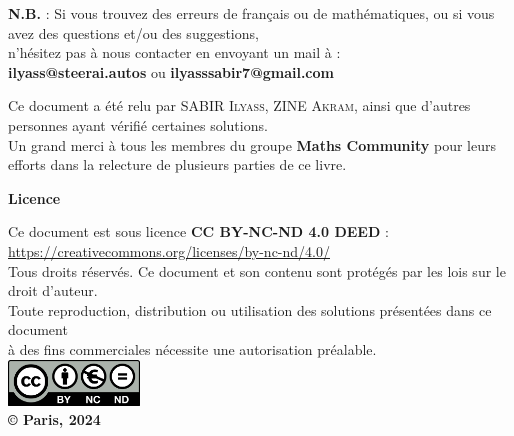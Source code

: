 \begin{center}
  \textbf{N.B.} : Si vous trouvez des erreurs de français ou de mathématiques, ou si vous avez des questions et/ou des suggestions,\\
  n'hésitez pas à nous contacter en envoyant un mail à :\\[0.2cm]
  \textbf{ilyass@steerai.autos} ou \textbf{ilyasssabir7@gmail.com}
\end{center}

\vspace{2cm}

\begin{center}
    Ce document a été relu par \textsc{SABIR Ilyass}, \textsc{ZINE Akram}, ainsi que d'autres personnes ayant vérifié certaines solutions.\\
    Un grand merci à tous les membres du groupe \textbf{Maths Community} pour leurs efforts dans la relecture de plusieurs parties de ce livre.
\end{center}

\vspace{1cm}

\begin{center}
  \textbf{Licence}
\end{center}

\begin{center}
  Ce document est sous licence \textbf{CC BY-NC-ND 4.0 DEED} :\\[0.2cm]
  \url{https://creativecommons.org/licenses/by-nc-nd/4.0/}\\[0.5cm]
  Tous droits réservés. Ce document et son contenu sont protégés par les lois sur le droit d'auteur.\\
  Toute reproduction, distribution ou utilisation des solutions présentées dans ce document\\
  à des fins commerciales nécessite une autorisation préalable.\\[0.5cm]
  \includegraphics[width=3.5cm]{licence/Cc_by-nc-nd_euro_icon.svg.png}\\[0.3cm]
  \textbf{\copyright{} Paris, 2024}
\end{center}